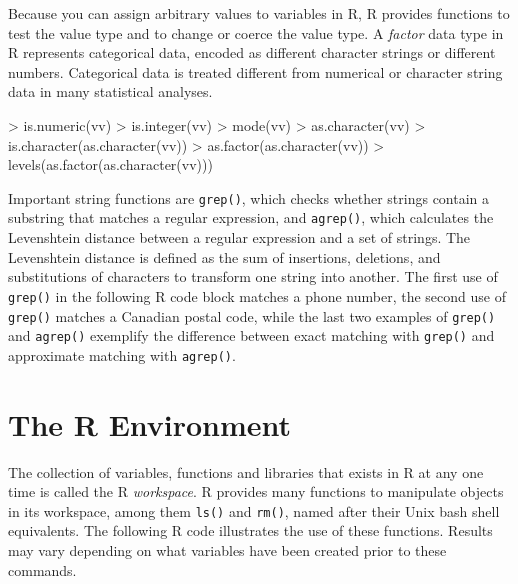 Because you can assign arbitrary values to variables in R, R provides functions to test the value type and to change or coerce the value type. A \emph{factor} data type in R represents categorical data, encoded as different character strings or different numbers. Categorical data is treated different from numerical or character string data in many statistical analyses.

\begin{samepage}
\begin{Rcode}
> is.numeric(vv)
> is.integer(vv)
> mode(vv)
> as.character(vv)
> is.character(as.character(vv))
> as.factor(as.character(vv))
> levels(as.factor(as.character(vv)))
\end{Rcode}
\end{samepage}

Important string functions are \texttt{grep()}, which checks whether strings contain a substring that matches a regular expression, and \texttt{agrep()}, which calculates the Levenshtein distance between a regular expression and a set of strings. The Levenshtein distance is defined as the sum of insertions, deletions, and substitutions of characters to transform one string into another. The first use of \texttt{grep()} in the following R code block matches a phone number, the second use of \texttt{grep()} matches a Canadian postal code, while the last two examples of \texttt{grep()} and \texttt{agrep()} exemplify the difference between exact matching with \texttt{grep()} and approximate matching with \texttt{agrep()}.

\begin{samepage}
\end{samepage}

\section{The R Environment}

The collection of variables, functions and libraries that exists in R at any one time is called the R \emph{workspace}. R provides many functions to manipulate objects in its workspace, among them \texttt{ls()} and \texttt{rm()}, named after their Unix bash shell equivalents. The following R code illustrates the use of these functions. Results may vary depending on what variables have been created prior to these commands.


